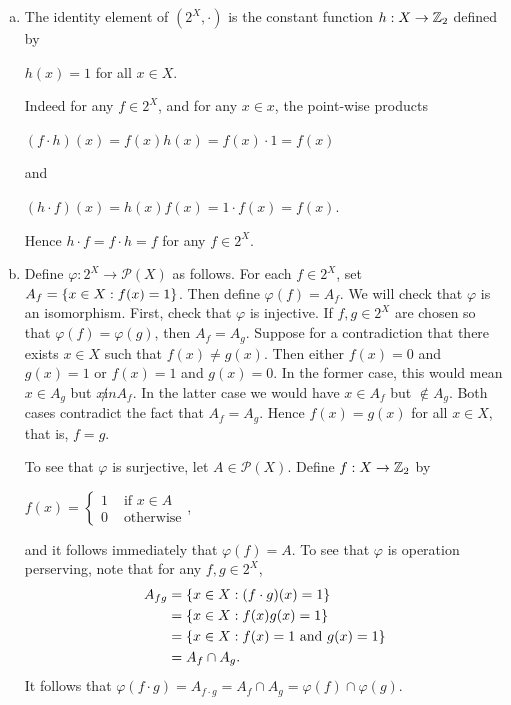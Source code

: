 \documentclass[11pt,fleqn,dvipsnames,usenames]{article}
\begin{document}
\begin{enumerate}[1.]
\solution
\begin{enumerate}[(a)]
\item The identity element of $(2^{X},\cdot)$ is the constant function $h:X\to\mathbb{Z}_{2}$ defined by
\begin{center}
$h(x) = 1$ for all $x\in X$.
\end{center}
Indeed for any $f\in 2^{X}$, and for any $x\in x$, the point-wise products
\begin{center}
$(f\cdot h)(x) = f(x)h(x) = f(x)\cdot 1 = f(x)$
\end{center}
and
\begin{center}
$(h\cdot f)(x) = h(x)f(x) = 1\cdot f(x) = f(x)$.
\end{center}
Hence $h\cdot f = f\cdot h = f$ for any $f\in 2^{X}$.
\item Define $\varphi:2^{X}\to \mathcal{P}(X)$ as follows.  For each $f\in 2^{X}$, set $A_{f} = \left\{x\in X:f(x) = 1\right\}$.  Then define $\varphi(f) = A_{f}$.  We will check that $\varphi$ is an isomorphism.  First, check that $\varphi$ is injective.  If $f,g\in 2^{X}$ are chosen so that $\varphi(f) = \varphi(g)$, then $A_{f} = A_{g}$.  Suppose for a contradiction that there exists $x\in X$ such that $f(x)\neq g(x)$.  Then either $f(x) = 0$ and $g(x) = 1$ or $f(x) = 1$ and $g(x) = 0$.  In the former case, this would mean $x\in A_{g}$ but $x\not in A_{f}$.  In the latter case we would have $x \in A_{f}$ but $\notin A_{g}$.  Both cases contradict the fact that $A_{f} = A_{g}$.  Hence $f(x) = g(x)$ for all $x\in X$, that is, $f = g$.
\vsmsp

To see that $\varphi$ is surjective, let $A\in \mathcal{P}(X)$.  Define $f:X\to\mathbb{Z}_{2}$ by
\begin{center}
$f(x) = \begin{cases}1 & \text{ if }x\in A\\0 & \text{ otherwise}\end{cases}$,
\end{center}
and it follows immediately that $\varphi(f) = A$.  To see that $\varphi$ is operation perserving, note that for any $f,g\in 2^{X}$,
\begin{align*}
A_{fg} &= \left\{x\in X:(f\cdot g)(x) = 1\right\}\\ &= \left\{x\in X:f(x)g(x) = 1\right\}\\ &= \left\{x\in X:f(x) = 1\text{ and }g(x) =1\right\}\\
&= A_{f}\cap A_{g}.
\end{align*}
It follows that $\varphi(f\cdot g) = A_{f\cdot g} = A_{f}\cap A_{g} = \varphi(f)\cap \varphi(g)$.
\end{enumerate}


\end{enumerate}
\end{document}
